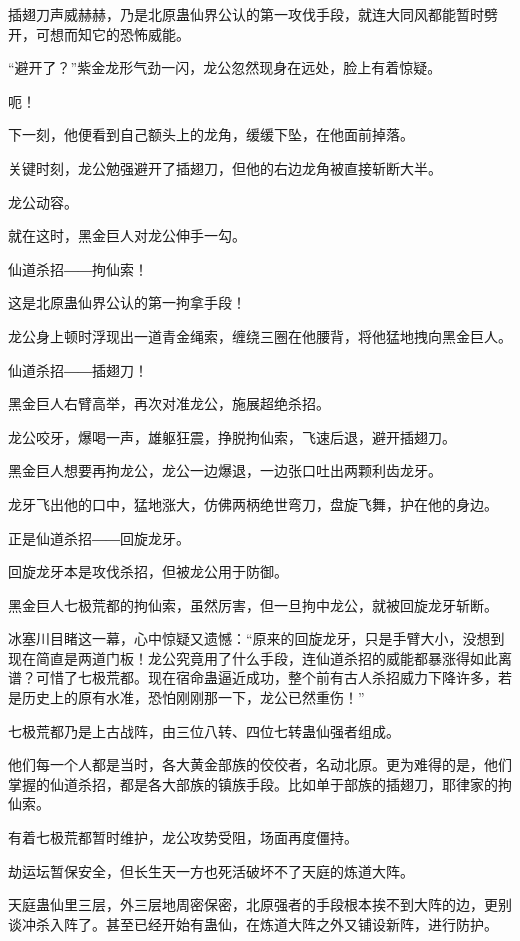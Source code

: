 
\begin{this_body}

插翅刀声威赫赫，乃是北原蛊仙界公认的第一攻伐手段，就连大同风都能暂时劈开，可想而知它的恐怖威能。

“避开了？”紫金龙形气劲一闪，龙公忽然现身在远处，脸上有着惊疑。

呃！

下一刻，他便看到自己额头上的龙角，缓缓下坠，在他面前掉落。

关键时刻，龙公勉强避开了插翅刀，但他的右边龙角被直接斩断大半。

龙公动容。

就在这时，黑金巨人对龙公伸手一勾。

仙道杀招――拘仙索！

这是北原蛊仙界公认的第一拘拿手段！

龙公身上顿时浮现出一道青金绳索，缠绕三圈在他腰背，将他猛地拽向黑金巨人。

仙道杀招――插翅刀！

黑金巨人右臂高举，再次对准龙公，施展超绝杀招。

龙公咬牙，爆喝一声，雄躯狂震，挣脱拘仙索，飞速后退，避开插翅刀。

黑金巨人想要再拘龙公，龙公一边爆退，一边张口吐出两颗利齿龙牙。

龙牙飞出他的口中，猛地涨大，仿佛两柄绝世弯刀，盘旋飞舞，护在他的身边。

正是仙道杀招――回旋龙牙。

回旋龙牙本是攻伐杀招，但被龙公用于防御。

黑金巨人七极荒都的拘仙索，虽然厉害，但一旦拘中龙公，就被回旋龙牙斩断。

冰塞川目睹这一幕，心中惊疑又遗憾：“原来的回旋龙牙，只是手臂大小，没想到现在简直是两道门板！龙公究竟用了什么手段，连仙道杀招的威能都暴涨得如此离谱？可惜了七极荒都。现在宿命蛊逼近成功，整个前有古人杀招威力下降许多，若是历史上的原有水准，恐怕刚刚那一下，龙公已然重伤！”

七极荒都乃是上古战阵，由三位八转、四位七转蛊仙强者组成。

他们每一个人都是当时，各大黄金部族的佼佼者，名动北原。更为难得的是，他们掌握的仙道杀招，都是各大部族的镇族手段。比如单于部族的插翅刀，耶律家的拘仙索。

有着七极荒都暂时维护，龙公攻势受阻，场面再度僵持。

劫运坛暂保安全，但长生天一方也死活破坏不了天庭的炼道大阵。

天庭蛊仙里三层，外三层地周密保密，北原强者的手段根本挨不到大阵的边，更别谈冲杀入阵了。甚至已经开始有蛊仙，在炼道大阵之外又铺设新阵，进行防护。


\end{this_body}
